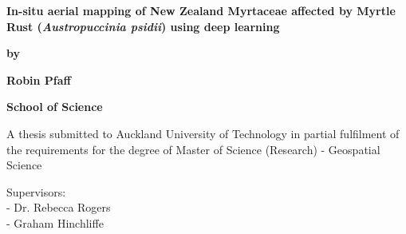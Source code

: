 \begin{titlepage}
    \centering
    \vspace*{2cm}
    {\fontsize{18}{22}\bfseries In-situ aerial mapping of New Zealand Myrtaceae affected by Myrtle Rust (\textit{Austropuccinia psidii}) using deep learning\par}
    \vspace{5.5cm}
    {\fontsize{12}{14}\bfseries by\par}
    {\fontsize{12}{14}\bfseries Robin Pfaff\par}
    {\fontsize{12}{14}\par}
    \vspace{5cm}
    {\fontsize{12}{14}\bfseries School of Science\par}
    \vspace{1.5cm}
    {\fontsize{12}{14}\selectfont A thesis submitted to Auckland University of Technology in partial fulfilment
of the requirements for the degree of Master of Science (Research) - Geospatial Science\par}
    \vfill
    \begin{flushleft}
        Supervisors:\\
        - Dr. Rebecca Rogers\\
        - Graham Hinchliffe
    \end{flushleft}
\end{titlepage}

\clearpage
{}
\setcounter{page}{2}